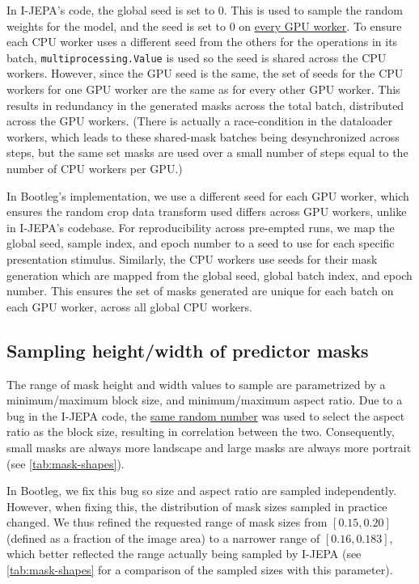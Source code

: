 In I-JEPA's code, the global seed is set to 0.
This is used to sample the random weights for the model, and the seed is set to 0 on \href{https://github.com/facebookresearch/ijepa/blob/52c1ae95d05f743e000e8f10a1f3a79b10cff048/src/train.py#L58-L60}{every GPU worker}.
To ensure each CPU worker uses a different seed from the others for the operations in its batch, \texttt{multiprocessing.Value} is used so the seed is shared across the CPU workers.
However, since the GPU seed is the same, the set of seeds for the CPU workers for one GPU worker are the same as for every other GPU worker.
This results in redundancy in the generated masks across the total batch, distributed across the GPU workers.
(There is actually a race-condition in the dataloader workers, which leads to these shared-mask batches being desynchronized across steps, but the same set masks are used over a small number of steps equal to the number of CPU workers per GPU.)

In Bootleg's implementation, we use a different seed for each GPU worker, which ensures the random crop data transform used differs across GPU workers, unlike in I-JEPA's codebase.
For reproducibility across pre-empted runs, we map the global seed, sample index, and epoch number to a seed to use for each specific presentation stimulus.
Similarly, the CPU workers use seeds for their mask generation which are mapped from the global seed, global batch index, and epoch number.
This ensures the set of masks generated are unique for each batch on each GPU worker, across all global CPU workers.


\subsection{Sampling height/width of predictor masks}
The range of mask height and width values to sample are parametrized by a minimum/maximum block size, and minimum/maximum aspect ratio.
Due to a bug in the I-JEPA code, the \href{https://github.com/facebookresearch/ijepa/blob/52c1ae95d05f743e000e8f10a1f3a79b10cff048/src/masks/multiblock.py#L56-L63}{same random number} was used to select the aspect ratio as the block size, resulting in correlation between the two.
Consequently, small masks are always more landscape and large masks are always more portrait (see \cref{tab:mask-shapes}).

In Bootleg, we fix this bug so size and aspect ratio are sampled independently.
However, when fixing this, the distribution of mask sizes sampled in practice changed.
We thus refined the requested range of mask sizes from $[0.15, 0.20]$ (defined as a fraction of the image area) to a narrower range of $[0.16, 0.183]$, which better reflected the range actually being sampled by I-JEPA (see \cref{tab:mask-shapes} for a comparison of the sampled sizes with this parameter).

